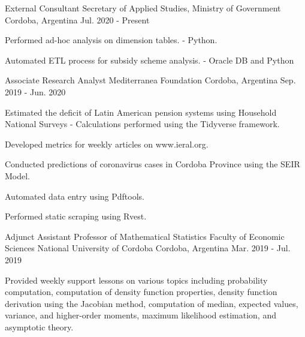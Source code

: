 \begin{cventries}
\cventry
    {External Consultant} %
	{Secretary of Applied Studies, Ministry of Government} %
    {Cordoba, Argentina} %
    {Jul. 2020 - Present} %
    {
     \begin{cvitems} %
     \item {Performed ad-hoc analysis on dimension tables. - Python.}
     \item {Automated ETL process for subsidy scheme analysis. - Oracle DB and Python}
     \end{cvitems}
    }

  \cventry
	{Associate Research Analyst} %
    {Mediterranea Foundation} %
    {Cordoba, Argentina} %
    {Sep. 2019 - Jun. 2020} %
    {
      \begin{cvitems} %
      \item {Estimated the deficit of Latin American pension systems using Household National Surveys - Calculations performed using the Tidyverse framework.}
      \item {Developed metrics for weekly articles on www.ieral.org.}
      \item {Conducted predictions of coronavirus cases in Cordoba Province using the SEIR Model.}
      \item {Automated data entry using Pdftools.}
      \item {Performed static scraping using Rvest.}
      \end{cvitems}
    }

  \cventry
    {Adjunct Assistant Professor of Mathematical Statistics} %
    {Faculty of Economic Sciences National University of Cordoba} %
    {Cordoba, Argentina} %
    {Mar. 2019 - Jul. 2019} %
    {
      \begin{cvitems} %
      \item {Provided weekly support lessons on various topics including probability computation, computation of density function properties, density function derivation using the Jacobian method, computation of median, expected values, variance, and higher-order moments, maximum likelihood estimation, and asymptotic theory.}
      \end{cvitems}
    }


\end{cventries}

